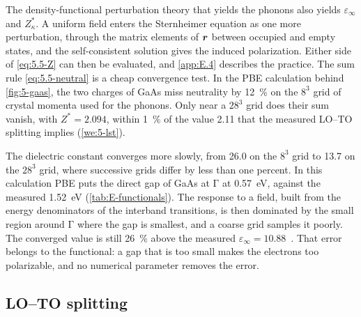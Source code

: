 The density-functional perturbation theory that yields the phonons also yields $\varepsilon_\infty$ and $Z^*_\kappa$. A uniform field enters the Sternheimer equation as one more perturbation, through the matrix elements of $\bm{r}$ between occupied and empty states, and the self-consistent solution gives the induced polarization. Either side of \cref{eq:5.5-Z} can then be evaluated, and \cref{app:E.4} describes the practice. The sum rule \cref{eq:5.5-neutral} is a cheap convergence test. In the PBE calculation behind \cref{fig:5-gaas}, the two charges of GaAs miss neutrality by \SI{12}{\percent} on the $8^3$ grid of crystal momenta used for the phonons. Only near a $28^3$ grid does their sum vanish, with $Z^* = 2.094$, within \SI{1}{\percent} of the value 2.11 that the measured LO--TO splitting implies (\cref{we:5-lst}).

The dielectric constant converges more slowly, from 26.0 on the $8^3$ grid to 13.7 on the $28^3$ grid, where successive grids differ by less than one percent. In this calculation PBE puts the direct gap of GaAs at $\mathrm{\Gamma}$ at \SI{0.57}{eV}, against the measured \SI{1.52}{eV} (\cref{tab:E-functionals}). The response to a field, built from the energy denominators of the interband transitions, is then dominated by the small region around $\mathrm{\Gamma}$ where the gap is smallest, and a coarse grid samples it poorly. The converged value is still \SI{26}{\percent} above the measured $\varepsilon_\infty = 10.88$~\cite{lockwood2005optical}. That error belongs to the functional: a gap that is too small makes the electrons too polarizable, and no numerical parameter removes the error.

\subsection{LO--TO splitting}

